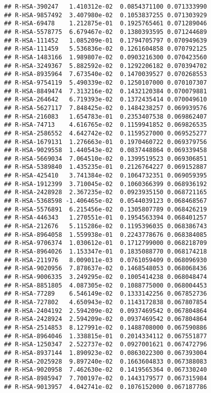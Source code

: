 \documentclass[
]{article}
\begin{document}
\begin{verbatim}
## R-HSA-390247   1.410312e-02  0.0854371100 0.071333990
## R-HSA-9857492  3.407980e-02  0.1053837255 0.071303929
## R-HSA-69478    1.212875e-01  0.1925765461 0.071289046
## R-HSA-5578775  6.679467e-02  0.1380393595 0.071244689
## R-HSA-111452   1.085209e-01  0.1794705797 0.070949639
## R-HSA-111459   5.536836e-02  0.1261604858 0.070792125
## R-HSA-1483166  1.989807e-02  0.0903216300 0.070423560
## R-HSA-3249367  5.882592e-02  0.1292206182 0.070394702
## R-HSA-8935964  7.673540e-02  0.1470039527 0.070268553
## R-HSA-9754119  5.490339e-02  0.1250107000 0.070107307
## R-HSA-8849474  7.313216e-02  0.1432120384 0.070079881
## R-HSA-264642   6.719393e-02  0.1372435414 0.070049610
## R-HSA-5627117  7.848425e-02  0.1484238257 0.069939576
## R-HSA-216083   1.654783e-01  0.2353407538 0.069862407
## R-HSA-74713    4.616765e-02  0.1159941852 0.069826535
## R-HSA-2586552  4.642742e-02  0.1159527000 0.069525277
## R-HSA-1679131  1.276663e-01  0.1970460722 0.069379756
## R-HSA-9029558  1.440543e-02  0.0837448864 0.069339458
## R-HSA-5669034  7.064510e-02  0.1399519523 0.069306851
## R-HSA-5389840  1.435235e-01  0.2126764227 0.069152887
## R-HSA-425410   3.741384e-02  0.1064732351 0.069059395
## R-HSA-1912399  3.710045e-02  0.1060366399 0.068936192
## R-HSA-2428928  2.367235e-02  0.0923935150 0.068721165
## R-HSA-5368598 -1.406465e-02  0.0544039123 0.068468567
## R-HSA-5576891  6.215456e-02  0.1305807789 0.068426219
## R-HSA-446343   1.270551e-01  0.1954563394 0.068401257
## R-HSA-212676   5.115286e-02  0.1195396035 0.068386743
## R-HSA-8964058  1.559938e-01  0.2243778676 0.068384085
## R-HSA-9706374  1.030612e-01  0.1712799000 0.068218709
## R-HSA-8964026  1.153347e-01  0.1835088770 0.068174218
## R-HSA-211976   8.009011e-03  0.0761059409 0.068096930
## R-HSA-9020956  7.878637e-02  0.1468548053 0.068068436
## R-HSA-9006335  3.249295e-02  0.1005414238 0.068048474
## R-HSA-8851805  4.087305e-02  0.1088775000 0.068004453
## R-HSA-77289    6.546149e-02  0.1333142256 0.067852736
## R-HSA-727802   4.650943e-02  0.1143172838 0.067807854
## R-HSA-2404192  2.594209e-02  0.0937469542 0.067804864
## R-HSA-2428924  2.594209e-02  0.0937469542 0.067804864
## R-HSA-2514853  8.127991e-02  0.1488708000 0.067590886
## R-HSA-8964046  1.338815e-01  0.2014334112 0.067551877
## R-HSA-1250347  2.522737e-02  0.0927001621 0.067472796
## R-HSA-8937144  1.890923e-02  0.0863022300 0.067393004
## R-HSA-2025928  9.897240e-02  0.1663604833 0.067388083
## R-HSA-9020958  7.462630e-02  0.1419565364 0.067330240
## R-HSA-8985947  7.700197e-02  0.1443179577 0.067315984
## R-HSA-9013957  4.042741e-02  0.1076152000 0.067187786

\end{verbatim}
\end{document}
